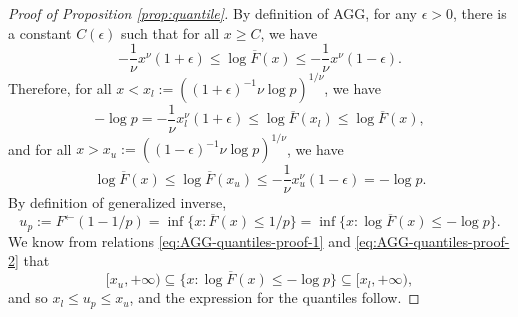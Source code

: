 % 
\begin{proof}[Proof of Proposition \ref{prop:quantile}]
By definition of AGG, for any $\epsilon>0$, there is a constant $C(\epsilon)$ such that for all $x\ge C$, we have
$$
-\frac{1}{\nu}x^\nu(1+\epsilon) \le \log{\overline{F}(x)} \le -\frac{1}{\nu}x^\nu(1-\epsilon).
$$
Therefore, for all $x < x_l := \left((1+\epsilon)^{-1}\nu\log{p}\right)^{1/\nu}$, we have
\begin{equation} \label{eq:AGG-quantiles-proof-1}
    -\log{p} = -\frac{1}{\nu}x_l^\nu(1+\epsilon) \le \log{\overline{F}(x_l)} \le \log{\overline{F}(x)},
\end{equation}
and for all $x > x_u := \left((1-\epsilon)^{-1}\nu\log{p}\right)^{1/\nu}$, we have
\begin{equation} \label{eq:AGG-quantiles-proof-2}
    \log{\overline{F}(x)} \le \log{\overline{F}(x_u)} \le -\frac{1}{\nu}x_u^\nu(1-\epsilon) = -\log{p}.
\end{equation}
By definition of generalized inverse,
\begin{equation*}
    u_p := F^\leftarrow(1-1/p) = \inf\{x:\overline{F}(x)\le 1/p\} = \inf\{x:\log{\overline{F}(x)} \le -\log{p}\}.
\end{equation*}
We know from relations \eqref{eq:AGG-quantiles-proof-1} and \eqref{eq:AGG-quantiles-proof-2} that 
$$
[x_u, +\infty) \subseteq \{x:\log{\overline{F}(x)} \le -\log{p}\} \subseteq [x_l, +\infty),
$$
and so $x_l\le u_p \le x_u$, and the expression for the quantiles follow.
\end{proof}

